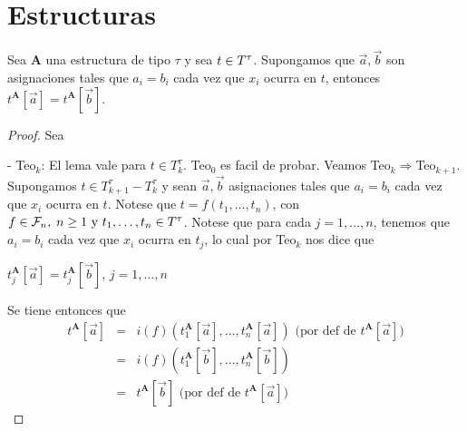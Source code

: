 \section{Estructuras}

  \begin{lemma} \label{lemma_43}
    \PN Sea $\mathbf{A}$ una estructura de tipo $\tau$ y sea $t\in T^{\tau}$. Supongamos que $\vec{a}, \vec{b}$ son
    asignaciones tales que $a_{i} = b_{i}$ cada vez que $x_{i}$ ocurra en $t$, entonces $t^{\mathbf{A}}[\vec{a}] =
    t^{\mathbf{A}}[\vec{b}]$.
  \end{lemma}
  \begin{proof}
    Sea

    - Teo$_{k}$: El lema vale para $t\in T_{k}^{\tau }$.
    Teo$_{0}$ es facil de probar. Veamos Teo$_{k}\Rightarrow $Teo$_{k+1}$. Supongamos $t\in T_{k+1}^{\tau }-T_{k}^{\tau }$
    y sean $\vec{a},\vec{b}$ asignaciones tales que $a_{i}=b_{i}$ cada vez que $x_{i}$ ocurra en $t$. Notese que
    $t=f(t_{1}, \dotsc, t_{n})$, con $f\in \mathcal{F}_{n},\;n\geq 1 \ \text{y} \  t_{1}, \dotsc, t_{n}\in T^{\tau}$. Notese que para
    cada $j=1, \dotsc, n$, tenemos que $a_{i}=b_{i}$ cada vez que $x_{i}$ ocurra en $t_{j}$, lo cual por Teo$_{k}$ nos
    dice que

    $t_{j}^{\mathbf{A}}[\vec{a}]=t_{j}^{\mathbf{A}}[\vec{b}]\text{, }j=1, \dotsc, n $

    Se tiene entonces que
    \[
      \begin{array}{ccl}
        t^{\mathbf{A}}[\vec{a}] &=& i(f)(t_{1}^{\mathbf{A}}[\vec{a}], \dotsc, t_{n}^{ \mathbf{A}}[\vec{a}])\text{ (por def de }t^{\mathbf{A}}[\vec{a}]\text{)} \\
        &=& i(f)(t_{1}^{\mathbf{A}}[\vec{b}], \dotsc, t_{n}^{\mathbf{A}}[\vec{b}]) \\
        &=& t^{\mathbf{A}}[\vec{b}]\text{ (por def de }t^{\mathbf{A}}[\vec{a}] \text{)}
      \end{array}
    \]
  \end{proof}

